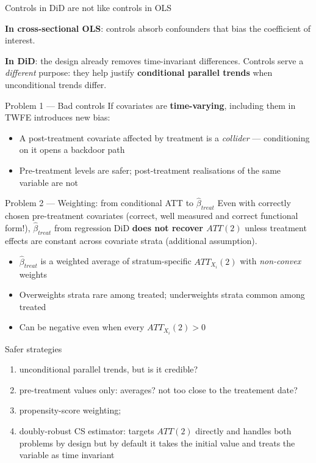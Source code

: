 \documentclass[aspectratio=169, 10pt]{beamer}
\begin{document}
\begin{frame}[shrink=20]{Controls in DiD are not like controls in OLS}

  \textbf{In cross-sectional OLS}: controls absorb confounders that bias the coefficient of interest.

  \smallskip
  \textbf{In DiD}: the design already removes time-invariant differences. Controls serve a \emph{different} purpose:
  they help justify \textbf{conditional parallel trends} when unconditional trends differ.

  \medskip
  \begin{alertblock}{Problem 1 — Bad controls \citep{huntingtonklein2023}}
    If covariates are \textbf{time-varying}, including them in TWFE introduces new bias:
    \begin{itemize}
      \item A post-treatment covariate affected by treatment is a \emph{collider} — conditioning on it opens a backdoor path
      \item Pre-treatment levels are safer; post-treatment realisations of the same variable are not
    \end{itemize}
  \end{alertblock}

  \medskip
  \begin{alertblock}{Problem 2 — Weighting: from conditional ATT to $\hat\beta_{treat}$ \citep{bakerdifference}}
    Even with correctly chosen pre-treatment covariates (correct, well measured and correct functional form!), $\hat\beta_{treat}$ from regression DiD
    \textbf{does not recover $ATT(2)$} unless treatment effects are constant across covariate strata (additional assumption).
    \begin{itemize}
      \item $\hat\beta_{treat}$ is a weighted average of stratum-specific $ATT_{X_i}(2)$ with \emph{non-convex} weights
      \item Overweights strata rare among treated; underweights strata common among treated
      \item Can be \alert{negative} even when every $ATT_{X_i}(2) > 0$
    \end{itemize}
  \end{alertblock}


\end{frame}

\begin{frame}{Safer strategies}
  \begin{enumerate}
    \item unconditional parallel trends, but is it credible?
    \item pre-treatment values only: averages? not too close to the treatement date?
    \item propensity-score weighting; 
    \item doubly-robust CS estimator: targets $ATT(2)$ directly and handles both problems by design but by default it takes the initial value and treats the variable as time invariant
  \end{enumerate}
\end{frame}
\end{document}
